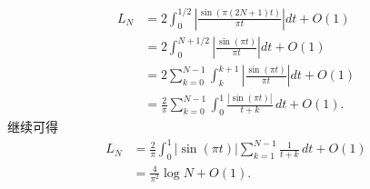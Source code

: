 \begin{Proof}
\[
\begin{aligned}
 L_N
 &=2\int_0^{1/2}\left|\frac{\sin(\pi(2N+1)t)}{\pi t}\right|dt+O(1)\\
 &=2\int_0^{N+1/2}\left|\frac{\sin(\pi t)}{\pi t}\right|dt+O(1)\\
 &=2\sum_{k=0}^{N-1}\int_k^{k+1}\left|\frac{\sin(\pi t)}{\pi t}\right|dt+O(1)\\
 &=\frac2\pi\sum_{k=0}^{N-1}\int_0^1\frac{|\sin(\pi t)|}{t+k}\,dt+O(1).
\end{aligned}
\]
\hypertarget{chapter-01-page-020}{}
继续可得
\[
\begin{aligned}
 L_N
 &=\frac2\pi\int_0^1|\sin(\pi t)|\sum_{k=1}^{N-1}\frac1{t+k}\,dt+O(1)\\
 &=\frac4{\pi^2}\log N+O(1).
\end{aligned}
\]
\end{Proof}

